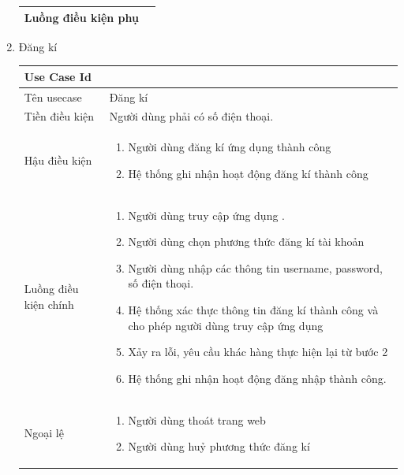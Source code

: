 \begin{enumerate}
\begin{center}{\color{black}}
\begin{tabular}{|p{5cm}|p{7cm}|}
        Luồng điều kiện phụ & \\ \hline
      
    \end{tabular}
\end{center}
\newpage
\item Đăng kí
\begin{center}{\color{black}}

    \begin{tabular}{|p{5cm}|p{7cm}|} \hline
    
        \textbf{Use Case Id} & \textbf{}  \\ \hline
        Tên usecase &  Đăng kí\\ \hline
        Tiền điều kiện & Người dùng phải có số điện thoại. \\ \hline
        
        Hậu điều kiện &
            \begin{enumerate}[1.]                
                \item Người dùng đăng kí ứng dụng thành công
                \item Hệ thống ghi nhận hoạt động đăng kí thành công
            \end{enumerate}\\ \hline
        
        Luồng điều kiện chính &  
            \begin{enumerate}[1.]
                \item Người dùng truy cập ứng dụng .
                \item Người dùng chọn phương thức đăng kí tài khoản
                \item  Người dùng nhập các thông tin username, password, số điện thoại.
                \item Hệ thống xác thực thông tin đăng kí thành công và cho phép người dùng truy cập ứng dụng
                \item Xảy ra lỗi, yêu cầu khác hàng thực hiện lại từ bước 2
                \item Hệ thống ghi nhận hoạt động đăng nhập thành công.
            \end{enumerate}\\
        \hline
        Ngoại lệ &
            \begin{enumerate}[1.]                
                \item  Người dùng thoát trang web
                \item Người dùng huỷ phương thức đăng kí
            \end{enumerate}\\ \hline
       

\end{tabular}
\end{center}
\end{enumerate}
